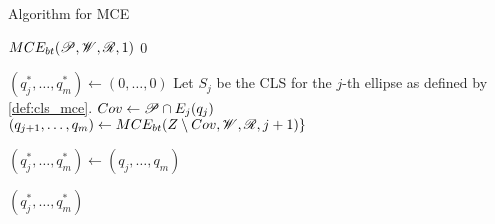 \begin{algorithm}
	\caption{Algorithm for MCE}\label{algoritmo:mce}
	
	\begin{algorithmic}[1]
		
		
		\item[]
		\State \Return $MCE_{bt}(\mathscr{P}, \mathscr{W}, \mathscr{R}, 1)$
		\EndProcedure
		\State
		\State \Return $0$
		\EndIf
		
		\State $(q_j^*, \dots, q_m^*) \gets (0, \dots, 0)$
		\State Let $S_j$ be the CLS for the $j$-th ellipse as defined by \autoref{def:cls_mce}.
		\State $Cov \gets \mathscr{P} \cap E_j(q_j)$
		\State $(q_{j+1}, \dots, q_m) \gets MCE_{bt}(Z \setminus Cov, \mathscr{W}, \mathscr{R}, j+1)\}$
		
		\State $(q_j^*, \dots, q_m^*) \gets(q_j, \dots, q_m)$
		\EndIf
		\EndFor
		
		\State \Return $(q_j^*, \dots, q_m^*)$
		\EndProcedure
	\end{algorithmic}
\end{algorithm}